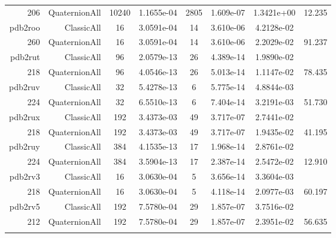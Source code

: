 \begin{xltabular}{\textwidth}{r|rcS[table-format=1.4e+2]cS[table-format=1.3e+2]S[table-format=1.4e+2]S[table-format=-1.3]}
206 & QuaternionAll & 10240 & 1.1655e-04 & 2805 & 1.609e-07 & 1.3421e+00 & 12.235\\  \addlinespace
pdb2roo & ClassicAll & 16 & 3.0591e-04 & 14 & 3.610e-06 & 4.2128e-02 & \\
260 & QuaternionAll & 16 & 3.0591e-04 & 14 & 3.610e-06 & 2.2029e-02 & 91.237\\  \addlinespace
pdb2rut & ClassicAll & 96 & 2.0579e-13 & 26 & 4.389e-14 & 1.9890e-02 & \\
218 & QuaternionAll & 96 & 4.0546e-13 & 26 & 5.013e-14 & 1.1147e-02 & 78.435\\  \addlinespace
pdb2ruv & ClassicAll & 32 & 5.4278e-13 & 6 & 5.775e-14 & 4.8844e-03 & \\
224 & QuaternionAll & 32 & 6.5510e-13 & 6 & 7.404e-14 & 3.2191e-03 & 51.730\\  \addlinespace
pdb2rux & ClassicAll & 192 & 3.4373e-03 & 49 & 3.717e-07 & 2.7441e-02 & \\
218 & QuaternionAll & 192 & 3.4373e-03 & 49 & 3.717e-07 & 1.9435e-02 & 41.195\\  \addlinespace
pdb2ruy & ClassicAll & 384 & 4.1535e-13 & 17 & 1.968e-14 & 2.8761e-02 & \\
224 & QuaternionAll & 384 & 3.5904e-13 & 17 & 2.387e-14 & 2.5472e-02 & 12.910\\  \addlinespace
pdb2rv3 & ClassicAll & 16 & 3.0630e-04 & 5 & 3.656e-14 & 3.3604e-03 & \\
218 & QuaternionAll & 16 & 3.0630e-04 & 5 & 4.118e-14 & 2.0977e-03 & 60.197\\  \addlinespace
pdb2rv5 & ClassicAll & 192 & 7.5780e-04 & 29 & 1.857e-07 & 3.7516e-02 & \\
212 & QuaternionAll & 192 & 7.5780e-04 & 29 & 1.857e-07 & 2.3951e-02 & 56.635\\  \addlinespace
\end{xltabular}
